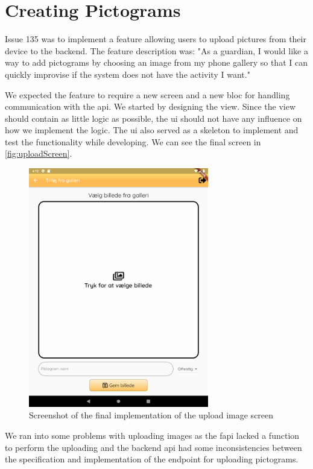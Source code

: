 \section{Creating Pictograms}

Issue 135 was to implement a feature allowing users to upload pictures from their device to the backend. The feature description was: "As a \gls{guardian}, I would like a way to add pictograms by choosing an image from my phone gallery so that I can quickly improvise if the system does not have the activity I want."

We expected the feature to require a new screen and a new \gls{bloc} for handling communication with the \gls{api}. We started by designing the view. Since the view should contain as little logic as possible, the \gls{ui} should not have any influence on how we implement the logic. The \gls{ui} also served as a skeleton to implement and test the functionality while developing. We can see the final screen in \autoref{fig:uploadScreen}.

\begin{figure}[!ht]
  \centering
  \includegraphics[width=0.7\textwidth]{figures/uploadPictogramScreen.png}
  \caption{Screenshot of the final implementation of the upload image screen}
  \label{fig:uploadScreen}
\end{figure}

We ran into some problems with uploading images as the \gls{fapi} lacked a function to perform the uploading and the backend \gls{api} had some inconsistencies between the specification and implementation of the endpoint for uploading pictograms. 

